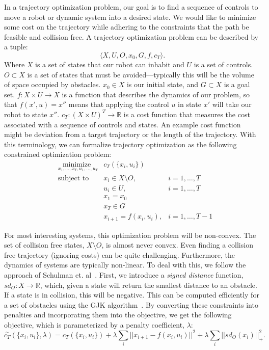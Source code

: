 In a trajectory optimization problem, our goal is to find a sequence of controls to move a
robot or dynamic system into a desired state. We would like to minimize some cost on the
trajectory while adhering to the constraints that the path be feasible and collision free.
A trajectory optimization problem can be described by a tuple:$$\langle X, U, O, x_0, G, f, c_T\rangle.$$
Where $X$ is a set of states that our robot can inhabit and $U$ is a set of controls. $O \subset X$ is a set of
states that must be avoided---typically this will be the volume of space occupied 
by obstacles. $x_0 \in X$ is our initial state, and $G\subset X$ is a goal set.
$f: X \times U \rightarrow X$ is a function that describes the dynamics of our problem, so that 
$f(x', u) = x''$ means that applying the control $u$ in state $x'$ will take our robot to state $x''$.
$c_T: (X \times U)^T \rightarrow \mathbb{R} $ is a cost function that measures the cost associated with 
a sequence of controls and states. An example cost function might be deviation from a target trajectory or
the length of the trajectory. With this terminology, we can formalize trajectory optimization
as the following constrained optimization problem:
\begin{align*}
 &\underset{x_1,\ldots, x_T, u_1,\ldots, u_T}{\text{minimize\ \ \ }} & c_T(\{x_i, u_i\}) \\
 &\text{subject to\ \ \ }
 & x_i \in X \setminus O, &i = 1,\ldots, T\\
 && u_i \in U , &i = 1,\ldots, T\\
 && x_1 = x_0 \\ && x_T \in G \\
 && x_{i+1} = f(x_i, u_i), &i = 1,\ldots,T-1
\end{align*}

For most interesting systems, this optimization problem will be non-convex. The set of collision free states, $X\setminus O$, is almost never convex. Even finding a collision free trajectory (ignoring costs) can be quite challenging.
Furthermore, the dynamics of systems are typically non-linear. To deal with this, we follow the approach of Schulman et. al~\cite{schulman2013trajopt}.
First, we introduce a \emph{signed distance} function, $sd_O: X \rightarrow \mathbb{R}$, which, given a state will return the smallest distance to an
obstacle. If a state is in collision, this will be negative. This can be computed efficiently for a set of obstacles using the GJK algorithm~\cite{GJK}.
By converting these constraints into penalties and incorporating them into the objective, we get the following objective, which is parameterized by a penalty coefficient, $\lambda$: 
$$\overset{\sim}{c_T}(\{x_i, u_i\}, \lambda) = c_T(\{x_i, u_i\}) + \lambda\sum_i ||x_{i+1} - f(x_i, u_i)||^2 + \lambda \sum_i ||sd_O(x_i)||^2_+.$$

